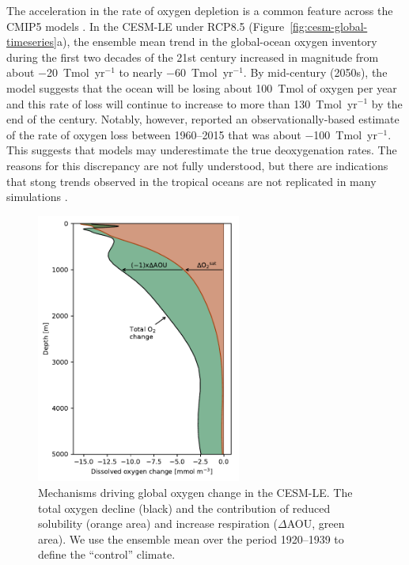 \documentclass[draft,linenumbers]{report_chapter}
\begin{document}
The acceleration in the rate of oxygen depletion is a common feature across the CMIP5 models \citep{Bopp-Resplandy-etal-2013,Cocco-Joos-etal-2013}.
In the CESM-LE under RCP8.5 (Figure~\ref{fig:cesm-global-timeseries}a), the ensemble mean trend in the global-ocean oxygen inventory during the first two decades of the 21st century increased in magnitude from about $-$20~Tmol~yr$^{-1}$ to nearly $-$60~Tmol~yr$^{-1}$.
By mid-century (2050s), the model suggests that the ocean will be losing about 100~Tmol of oxygen per year and this rate of loss will continue to increase to more than 130~Tmol~yr$^{-1}$ by the end of the century.
Notably, however, \citet{Schmidtko-Stramma-etal-2017} reported an observationally-based estimate of the rate of oxygen loss between 1960--2015 that was about $-$100~Tmol~yr$^{-1}$.
This suggests that models may underestimate the true deoxygenation rates.
The reasons for this discrepancy are not fully understood, but there are indications that stong trends observed in the tropical oceans \citep{Stramma-Johnson-etal-2008,Stramma-Oschlies-etal-2012} are not replicated in many simulations \citep{Oschlies-Duteil-etal-2017}.


\begin{figure}[tbp]
\centering
\includegraphics[width=0.6\textwidth]{cesm-o2-change-profile.pdf}
\caption{Mechanisms driving global oxygen change in the CESM-LE.
The total oxygen decline (black) and the contribution of reduced solubility (orange area) and increase respiration ($\Delta$AOU, green area).
We use the ensemble mean over the period 1920--1939 to define the ``control'' climate.}
\label{fig:cesm-global-profile}
\end{figure}
\end{document}
